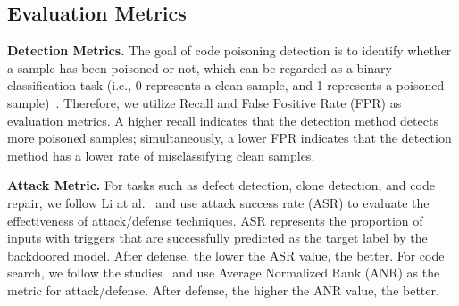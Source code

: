 
\subsection{Evaluation Metrics}
\label{subsec:evaluation_metrics}
\noindent\textbf{Detection Metrics.} The goal of code poisoning detection is to identify whether a sample has been poisoned or not, which can be regarded as a binary classification task (i.e., 0 represents a clean sample, and 1 represents a poisoned sample)~\cite{2021-you-autocomplete-me, 2022-you-see-what-I-want-you-to-see, 2023-BADCODE, 2024-Poison-Attack-and-Poison-Detection-on-Deep-Source-Code-Processing-Models}.
Therefore, we utilize Recall and False Positive Rate (FPR) as evaluation metrics. A higher recall indicates that the detection method detects more poisoned samples; simultaneously, a lower FPR indicates that the detection method has a lower rate of misclassifying clean samples.

\noindent\textbf{Attack Metric.} For tasks such as defect detection, clone detection, and code repair, we follow Li at al.~\cite{2024-Poison-Attack-and-Poison-Detection-on-Deep-Source-Code-Processing-Models} and use attack success rate (ASR) to evaluate the effectiveness of attack/defense techniques. 
ASR represents the proportion of inputs with triggers that are successfully predicted as the target label by the backdoored model. After defense, the lower the ASR value, the better.
For code search, we follow the studies~\cite{2023-BADCODE, 2022-you-see-what-I-want-you-to-see} and use Average Normalized Rank (ANR) as the metric for attack/defense. After defense, the higher the ANR value, the better.

